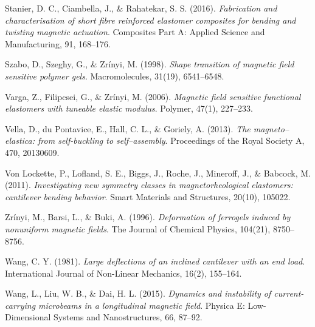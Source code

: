 \documentclass[oneside]{article}
\begin{document}
\begin{thebibliography}{9}
				 Stanier, D. C., Ciambella, J., \& Rahatekar, S. S. (2016). \textit{Fabrication and characterisation of short fibre reinforced elastomer composites for bending and twisting magnetic actuation}. Composites Part A: Applied Science and Manufacturing, 91, 168--176. 
				
				 Szabo, D., Szeghy, G., \& Zr{\'i}nyi, M. (1998). \textit{Shape transition of magnetic field sensitive polymer gels}. Macromolecules, 31(19), 6541--6548.
				
				 Varga, Z., Filipcsei, G., \& Zr{\'i}nyi, M. (2006). \textit{Magnetic field sensitive functional elastomers with tuneable elastic modulus}. Polymer, 47(1), 227--233.
				
				 Vella, D., du Pontavice, E., Hall, C. L., \& Goriely, A. (2013). \textit{The magneto--elastica: from self-buckling to self--assembly}. Proceedings of the Royal Society A, 470, 20130609. 
				
				 Von Lockette, P., Lofland, S. E., Biggs, J., Roche, J., Mineroff, J., \& Babcock, M. (2011). \textit{Investigating new symmetry classes in magnetorheological elastomers: cantilever bending behavior}. Smart Materials and Structures, 20(10), 105022. 
				
				 Zr{\'i}nyi, M., Barsi, L., \& Buki, A. (1996).\textit{ Deformation of ferrogels induced by nonuniform magnetic fields}. The Journal of Chemical Physics, 104(21), 8750--8756. 
				
				 Wang, C. Y. (1981). \textit{Large deflections of an inclined cantilever with an end load}. International Journal of Non-Linear Mechanics, 16(2), 155--164. 
				
				 Wang, L., Liu, W. B., \& Dai, H. L. (2015). \textit{Dynamics and instability of current-carrying microbeams in a longitudinal magnetic field}. Physica E: Low-Dimensional Systems and Nanostructures, 66, 87--92. 
				
			\end{thebibliography}
\end{document}
